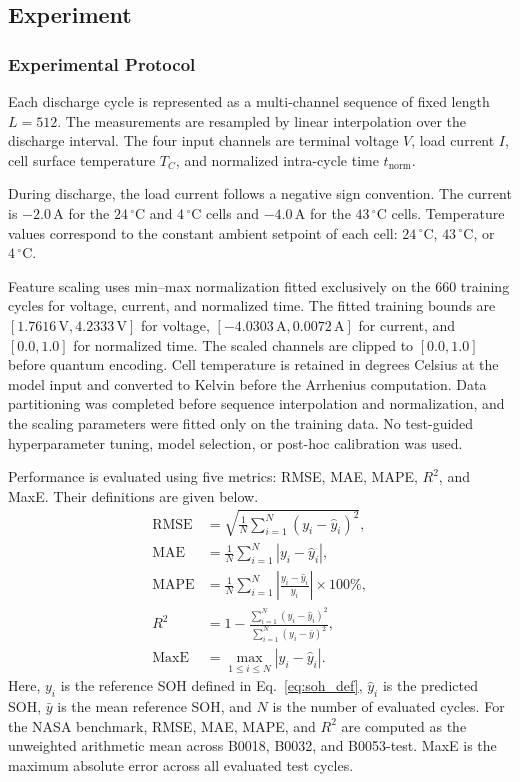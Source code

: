 \documentclass[a4paper,fleqn]{cas-sc}
\begin{document}
\subsection{Experiment}\label{sec:experiment}

\subsubsection{Experimental Protocol}\label{sec:experimental_protocol}

Each discharge cycle is represented as a multi-channel sequence of fixed length $L = 512$. The measurements are resampled by linear interpolation over the discharge interval. The four input channels are terminal voltage $V$, load current $I$, cell surface temperature $T_C$, and normalized intra-cycle time $t_{\mathrm{norm}}$.

During discharge, the load current follows a negative sign convention. The current is $-2.0\,\mathrm{A}$ for the $24\,^\circ\mathrm{C}$ and $4\,^\circ\mathrm{C}$ cells and $-4.0\,\mathrm{A}$ for the $43\,^\circ\mathrm{C}$ cells. Temperature values correspond to the constant ambient setpoint of each cell: $24\,^\circ\mathrm{C}$, $43\,^\circ\mathrm{C}$, or $4\,^\circ\mathrm{C}$.

Feature scaling uses min--max normalization fitted exclusively on the 660 training cycles for voltage, current, and normalized time. The fitted training bounds are $[1.7616\,\mathrm{V}, 4.2333\,\mathrm{V}]$ for voltage, $[-4.0303\,\mathrm{A}, 0.0072\,\mathrm{A}]$ for current, and $[0.0, 1.0]$ for normalized time. The scaled channels are clipped to $[0.0, 1.0]$ before quantum encoding. Cell temperature is retained in degrees Celsius at the model input and converted to Kelvin before the Arrhenius computation. Data partitioning was completed before sequence interpolation and normalization, and the scaling parameters were fitted only on the training data. No test-guided hyperparameter tuning, model selection, or post-hoc calibration was used.

Performance is evaluated using five metrics: RMSE, MAE, MAPE, $R^2$, and MaxE. Their definitions are given below.
\begin{align}
\mathrm{RMSE} &= \sqrt{\frac{1}{N}\sum_{i=1}^{N}(y_i-\hat{y}_i)^2}, \label{eq:rmse} \\
\mathrm{MAE} &= \frac{1}{N}\sum_{i=1}^{N}|y_i-\hat{y}_i|, \label{eq:mae} \\
\mathrm{MAPE} &= \frac{1}{N}\sum_{i=1}^{N}\left|\frac{y_i-\hat{y}_i}{y_i}\right|\times 100\%, \label{eq:mape} \\
R^2 &= 1-\frac{\sum_{i=1}^{N}(y_i-\hat{y}_i)^2}{\sum_{i=1}^{N}(y_i-\bar{y})^2}, \label{eq:r2} \\
\mathrm{MaxE} &= \max_{1\le i\le N}|y_i-\hat{y}_i|. \label{eq:maxe}
\end{align}
Here, $y_i$ is the reference SOH defined in Eq.~\eqref{eq:soh_def}, $\hat{y}_i$ is the predicted SOH, $\bar{y}$ is the mean reference SOH, and $N$ is the number of evaluated cycles. For the NASA benchmark, RMSE, MAE, MAPE, and $R^2$ are computed as the unweighted arithmetic mean across B0018, B0032, and B0053-test. MaxE is the maximum absolute error across all evaluated test cycles.
\end{document}

